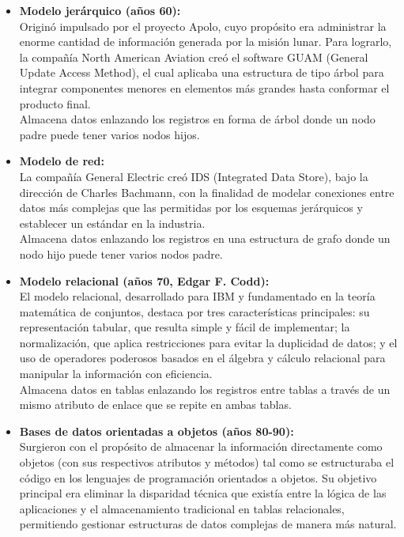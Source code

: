 \documentclass[12pt,a4paper]{article}
\begin{document}
\begin{itemize}
  \item \textbf{Modelo jerárquico (años 60):} \\
  Originó impulsado por el proyecto Apolo, cuyo propósito era administrar la enorme cantidad de información generada por la misión lunar. Para lograrlo, la compañía North American Aviation creó el software GUAM (General Update Access Method), el cual aplicaba una estructura de tipo árbol para integrar componentes menores en elementos más grandes hasta conformar el producto final.\\
  Almacena datos enlazando los registros en forma de árbol donde un nodo padre puede tener varios nodos hijos.\\

  \item \textbf{Modelo de red:} \\
  La compañía General Electric creó IDS (Integrated Data Store), bajo la dirección de Charles Bachmann, con la finalidad de modelar conexiones entre datos más complejas que las permitidas por los esquemas jerárquicos y establecer un estándar en la industria.\\
  Almacena datos enlazando los registros en una estructura de grafo donde un nodo hijo puede tener varios nodos padre. \\

  \item \textbf{Modelo relacional (años 70, Edgar F. Codd):} \\
  El modelo relacional, desarrollado para IBM y fundamentado en la teoría matemática de conjuntos, destaca por tres características principales: su representación tabular, que resulta simple y fácil de implementar; la normalización, que aplica restricciones para evitar la duplicidad de datos; y el uso de operadores poderosos basados en el álgebra y cálculo relacional para manipular la información con eficiencia. \\
  Almacena datos en tablas enlazando los registros entre tablas a través de un mismo atributo de enlace que se repite en ambas tablas.\\

  \item \textbf{Bases de datos orientadas a objetos (años 80-90):} \\
  Surgieron con el propósito de almacenar la información directamente como objetos (con sus respectivos atributos y métodos) tal como se estructuraba el código en los lenguajes de programación orientados a objetos. Su objetivo principal era eliminar la disparidad técnica que existía entre la lógica de las aplicaciones y el almacenamiento tradicional en tablas relacionales, permitiendo gestionar estructuras de datos complejas de manera más natural. \\


\end{itemize}
\end{document}
